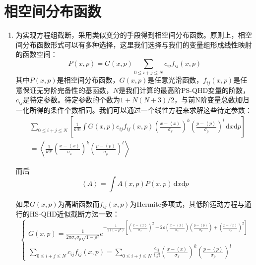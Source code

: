 \documentclass[12pt,a4paper,openany,twoside]{book}
\numberwithin{equation}{section}
\newcommand{\mean}[1]{\left\langle #1 \right\rangle}
\newcommand{\ud}{\mathrm{d}}
\begin{document}
      \section{相空间分布函数}
        \begin{enumerate}
          \item 为实现方程组截断，采用类似变分的手段得到相空间分布函数。原则上，相空间分布函数形式可以有多种选择，这里我们选择与我们的变量组形成线性映射的函数空间：
            \begin{equation}
              P(x,p)=G(x,p)\sum_{0 \leq i+j \leq N} c_{ij} f_{ij} (x,p)
            \end{equation}
            其中$P(x,p)$是相空间分布函数，$G(x,p)$是任意光滑函数，$f_{ij}(x,p)$是任意保证无穷阶完备性的基函数，$N$是我们计算的最高阶PS-QHD变量的阶数，$c_{ij}$是待定参数。待定参数的个数为$1+N(N+3)/2$，与前N阶变量总数加归一化所得的条件个数相同。我们可以通过一个线性方程来求解这些待定参数：
            \begin{align*}
              &\sum_{0\leq i+j\leq N}\left[\frac{1}{k!l!}\int G(x,p)c_{ij}f_{ij}(x,p)\left(\frac{x-\mean{x}}{\sigma_x}\right)^{k}\left(\frac{p-\mean{p}}{\sigma_p}\right)^{l}\,\ud x\ud p\right]\\
              &=\mean{\frac{1}{k!l!}\left(\frac{x-\mean{x}}{\sigma_x}\right)^{k}\left(\frac{p-\mean{p}}{\sigma_p}\right)^{l}}
            \end{align*}

            而后
            \begin{equation}
              \mean{A}=\int A(x,p) P(x,p) \, \ud x\ud p
            \end{equation}

            如果$G(x,p)$为高斯函数而$f_{ij}(x,p)$为Hermite多项式，其低阶运动方程与通行的HS-QHD近似截断方法一致：
            \begin{equation}
              \begin{cases}
                G(x,p)=\frac{1}{2\pi \sigma_x\sigma_p\sqrt{1-\rho^2}}e^{-\frac{1}{2(1-\rho^2)}\left[\left(\frac{x-\mean{x}}{\sigma_x}\right)^2-2\rho\left(\frac{x-\mean{x}}{\sigma_x}\right)\left(\frac{p-\mean{p}}{\sigma_p}\right)+\left(\frac{p-\mean{p}}{\sigma_p}\right)^2\right]}\\
                \sum_{0\leq i+j \leq N}c_{ij}f_{ij}(x,p)=\sum_{0\leq i+j \leq N}\frac{c_{ij}}{i!j!}\left(\frac{x-\mean{x}}{\sigma_x}\right)^{k}\left(\frac{p-\mean{p}}{\sigma_p}\right)^{l}
              \end{cases}
            \end{equation}
        \end{enumerate}
\end{document}
